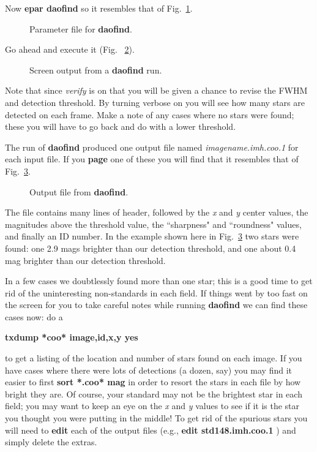 Now {\bf epar daofind} so it resembles that of Fig.~\ref{photdaofind}.
\begin{figure}
\vspace{3.5in}
\caption{\label{photdaofind} Parameter file for {\bf daofind}.}
\end{figure}
Go ahead and execute it (Fig. ~\ref{daoout}). 
\begin{figure}
\vspace{3.5in}
\caption{\label{daoout} Screen output from a {\bf daofind} run.}
\end{figure}
Note that since {\it verify} is on that you
will be given a chance to revise the FWHM and detection threshold.  By
turning verbose on you will see how many stars are detected on each
frame.  
% 
% 
Make a note of any cases where no stars were found; these you will have
to
go back and do with a lower threshold.
 
The run of {\bf daofind} produced one output file named {\it
imagename.imh.coo.1} for each input file.  If you {\bf page} one of
these you will find that it resembles that of Fig.~\ref{photcooout}.
\begin{figure}
\vspace{3.7in}
\caption{\label{photcooout} Output file from {\bf daofind}.}
\end{figure}
The file contains many lines of header, followed by the {\it x} and {\it
y} center values, the magnitudes above the threshold value, the ``sharpness"
and ``roundness" values, and finally an ID number.
In the example shown
here in Fig.~\ref{photcooout} two stars were found: one 2.9 mags
brighter than our detection threshold, and one about 0.4 mag brighter
than our detection threshold.
 
In a few cases we doubtlessly found more than one star; this is a good
time to get rid of the uninteresting non-standards in each field.
If things went by too fast on the screen for you to take careful notes
while running {\bf daofind} we can find these cases now: do a 

\centerline{ {\bf txdump *coo* image,id,x,y yes }}

 
\noindent
to get a listing of the location and number of stars found on each image.
If you have cases where there were lots of
detections (a dozen, say) you may find it easier to first {\bf sort
*.coo* mag} in order to resort the stars in each file by how bright they
are.  Of course, your standard may not be the brightest star in each
field; you may want to keep an eye on the {\it x} and {\it y} values to
see if it is the star you thought you were putting in the middle! 
To get rid of the spurious stars you will need to {\bf edit} each of the
output files (e.g., {\bf edit std148.imh.coo.1} ) and simply delete the
extras.
 
